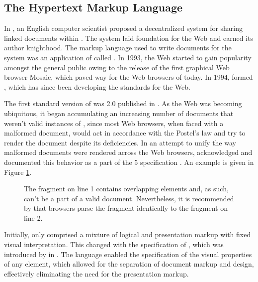 \subsection{The Hypertext Markup Language}
In \citeyear{bernerslee89}, an English computer scientist  proposed a decentralized system for sharing linked documents within
 \cite{bernerslee89}. The system laid foundation for the Web
and earned its author knighthood.  The markup language used to write documents
for the system was an application of  called . In
1993, the Web started to gain popularity amongst the general public owing to the
release of the first graphical Web browser Mosaic, which paved way for the Web
browsers of today. In 1994,  formed
, which has since been developing the standards for the Web.

The first standard version of  was  2.0
\cite{bernerslee95} published in \citeyear{bernerslee95}. As the Web was
becoming ubiquitous, it began accumulating an increasing number of documents
that weren't valid instances of , since most Web browsers, when
faced with a malformed document, would act in accordance with the Postel's law
and try to render the document despite its deficiencies. In an attempt to unify
the way malformed  documents were rendered across the Web
browsers,  acknowledged and documented this behavior as a part of
the 5 specification \cite[sec.\,8.2]{hickson14}. An example is
given in Figure \ref{fig:overlapping-elements}.

\begin{figure}[b]
  \caption{The fragment on line 1 contains overlapping elements and, as such,
    can't be a part of a valid  document. Nevertheless, it is
    recommended by  that browsers parse the fragment identically to
    the fragment on line 2.}
  \label{fig:overlapping-elements}
\end{figure}

Initially,  only comprised a mixture of logical and presentation
markup with fixed visual interpretation. This changed with the specification of
, which was introduced by  in \citeyear{lie96}. The
language enabled the specification of the visual properties of any element,
which allowed for the separation of document markup and design, effectively
eliminating the need for the presentation markup.

